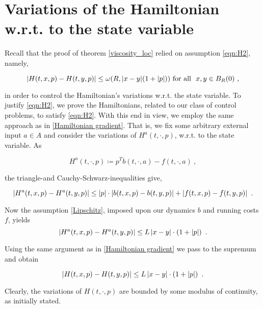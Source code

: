 \section{Variations of the Hamiltonian w.r.t. to the state variable}
\label{state hamiltonian}

Recall that the proof of theorem \ref{viscosity_loc} relied on assumption \eqref{eqn:H2}, namely,

\begin{equation*}
	\lvert H(t, x, p) - H(t, y, p) \rvert \leq \omega(R, \lvert x - y \rvert (1 + \lvert p \rvert)) \hbox{ for all } \ x, y \in B_R(0) \ ,
\end{equation*}

in order to control the Hamiltonian's variations w.r.t. the state variable. To justify \eqref{eqn:H2}, we prove the Hamiltonians, related to our class of control problems, to satisfy \eqref{eqn:H2}. With this end in view, we employ the same approach as in \ref{Hamiltonian gradient}. That is, we fix some arbitrary external input $ a \in A $ and consider the variations of
$ H^{a}(t, \cdot, p) $, w.r.t. to the state variable. As

\begin{equation*}
	H^{a}(t, \cdot, p) \coloneqq p^{T} b(t, \cdot, a) - f(t, \cdot, a) \ ,
\end{equation*}

the triangle-and Cauchy-Schwarz-inequalities give,

\begin{equation*}
	\left\lvert {H^{a}(t, x, p) - H^{a}(t, y, p) } \right\rvert \leq \left\lvert {p} \right\rvert \cdot \left\lvert {b(t, x, p) - b(t, y, p)} \right\rvert + \left\lvert {f(t, x, p) - f(t, y, p)} \right\rvert \ .
\end{equation*}

Now the assumption \eqref{Lipschitz}, imposed upon our dynamics $ b $ and running costs $ f $, yields
\begin{equation*}
	\normof{H^{a}(t, x, p) - H^{a}(t, y, p) } \leq L \normof{x - y} \cdot \left(1 + \normof{p }\right) \ .
\end{equation*}

Using the same argument as in \ref{Hamiltonian gradient} we pass to the supremum and obtain

\begin{equation*}
	\left\lvert {H(t, x, p) - H(t, y, p) } \right\rvert \leq L \left\lvert {x - y} \right\rvert \cdot \left(1 + \left\lvert {p } \right\rvert\right) \ .
\end{equation*}

Clearly, the variations of $ H(t, \cdot, p) $ are bounded by some modulus of continuity, as initially stated.

